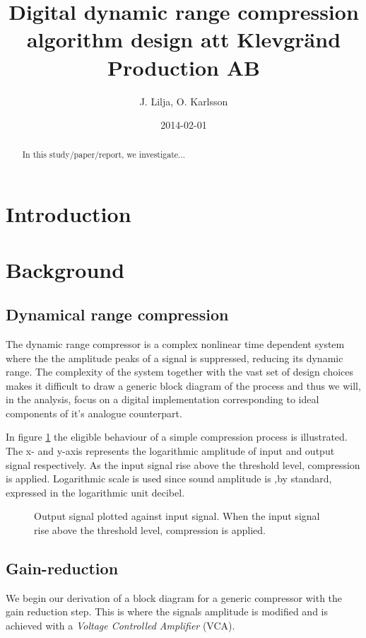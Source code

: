 \documentclass[]{article}
\begin{document}
\title{Digital dynamic range compression algorithm design att Klevgränd Production AB}
\author{J. Lilja, O. Karlsson}
\date{2014-02-01}
\maketitle

\begin{abstract}
In this study/paper/report, we investigate...
\end{abstract}

\clearpage
\section{Introduction}
\section{Background}
\subsection{Dynamical range compression}
The dynamic range compressor is a complex nonlinear time dependent system where the the amplitude peaks of a signal is suppressed, reducing its dynamic range. The complexity of the system together with the vast set of design choices makes it difficult to draw a generic block diagram of the process\cite{giannoullis}  and thus we will, in the analysis, focus on a digital implementation corresponding to ideal components of it's analogue counterpart. 

In figure \ref{fig:xy-graph} the eligible behaviour of a simple compression process is illustrated. The x- and y-axis represents the logarithmic amplitude of input and output signal respectively. As the input signal rise above the threshold level, compression is applied. Logarithmic scale is used since sound amplitude is ,by standard, expressed in the logarithmic unit decibel.

\begin{figure}[ht]
\centering

\caption{Output signal plotted against input signal. When the input signal rise above the threshold level, compression is applied.} 
\label{fig:xy-graph}
\end{figure}

\subsection{Gain-reduction}
We begin our derivation of a block diagram for a generic compressor with the gain reduction step. This is where the signals amplitude is modified and is achieved with a \emph{Voltage Controlled Amplifier} (VCA).
\end{document}
